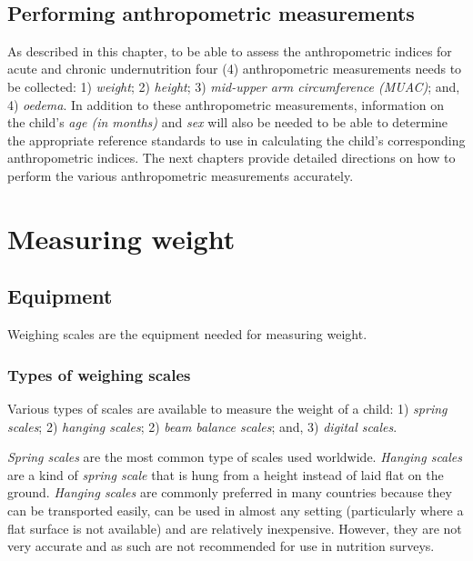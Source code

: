 \documentclass[12pt,]{book}
\theoremstyle{definition}
\theoremstyle{definition}
\theoremstyle{definition}
\theoremstyle{remark}
\begin{document}
~

\hypertarget{performing-anthropometric-measurements}{%
\section{Performing anthropometric
measurements}\label{performing-anthropometric-measurements}}

As described in this chapter, to be able to assess the anthropometric
indices for acute and chronic undernutrition four (4) anthropometric
measurements needs to be collected: 1) \emph{weight}; 2) \emph{height};
3) \emph{mid-upper arm circumference (MUAC)}; and, 4) \emph{oedema}. In
addition to these anthropometric measurements, information on the
child's \emph{age (in months)} and \emph{sex} will also be needed to be
able to determine the appropriate reference standards to use in
calculating the child's corresponding anthropometric indices. The next
chapters provide detailed directions on how to perform the various
anthropometric measurements accurately.

\hypertarget{weight}{%
\chapter{Measuring weight}\label{weight}}

\hypertarget{equipment}{%
\section{Equipment}\label{equipment}}

Weighing scales are the equipment needed for measuring weight.

\hypertarget{types-of-weighing-scales}{%
\subsection{Types of weighing scales}\label{types-of-weighing-scales}}

Various types of scales are available to measure the weight of a child:
1) \emph{spring scales}; 2) \emph{hanging scales}; 2) \emph{beam balance
scales}; and, 3) \emph{digital scales}.

\emph{Spring scales} are the most common type of scales used worldwide.
\emph{Hanging scales} are a kind of \emph{spring scale} that is hung
from a height instead of laid flat on the ground. \emph{Hanging scales}
are commonly preferred in many countries because they can be transported
easily, can be used in almost any setting (particularly where a flat
surface is not available) and are relatively inexpensive. However, they
are not very accurate and as such are not recommended for use in
nutrition surveys.
\end{document}
